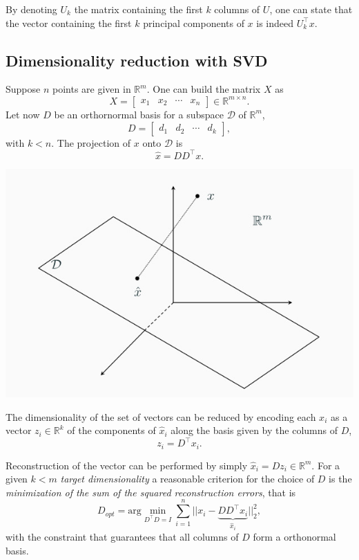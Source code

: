 \documentclass[10pt]{report}
\begin{document}
By denoting \(U_k\) the matrix containing the first \(k\) columns of \(U\), one can state that the vector containing the first \(k\) principal components of \(x\) is indeed \(U^\top_k x\).
\subsection{Dimensionality reduction with SVD}
\label{sec:orgc0bc744}
Suppose \(n\) points are given in \(\mathbb{R}^m\). One can build the matrix \(X\) as $$X = \begin{bmatrix}x_1 & x_2 & \cdots & x_n\end{bmatrix} \in \mathbb{R}^{m \times n}.$$ Let now \(D\) be an orthornormal basis for a subspace \(\mathcal D\) of \(\mathbb{R}^m\), $$D = \begin{bmatrix} d_1 & d_2 & \cdots & d_k\end{bmatrix},$$ with \(k < n\). The projection of \(x\) onto \(\mathcal D\) is $$\hat x = DD^\top x.$$

\begin{center}
\includegraphics[scale=0.3]{./pics/alg/proj-d.jpg}
\end{center}

The dimensionality of the set of vectors can be reduced by encoding each \(x_i\) as a vector \(z_i \in \mathbb{R}^k\) of the components of \(\hat {x}_i\) along the basis given by the columns of \(D\), $$z_i = D^\top x_i.$$

Reconstruction of the vector can be performed by simply \(\hat {x}_i = Dz_i \in \mathbb{R}^m.\) For a given \(k < m\) \emph{target dimensionality} a reasonable criterion for the choice of \(D\) is the \emph{minimization of the sum of the squared reconstruction errors}, that is
$$D_{opt} = \mbox{arg} \min_{D^\top D = I} \sum_{i=1}^n ||x_i - \underbrace{DD^\top x_i}_{\hat x_i}||^2_2,$$ with the constraint that guarantees that all columns of \(D\) form a orthonormal basis.
\end{document}
